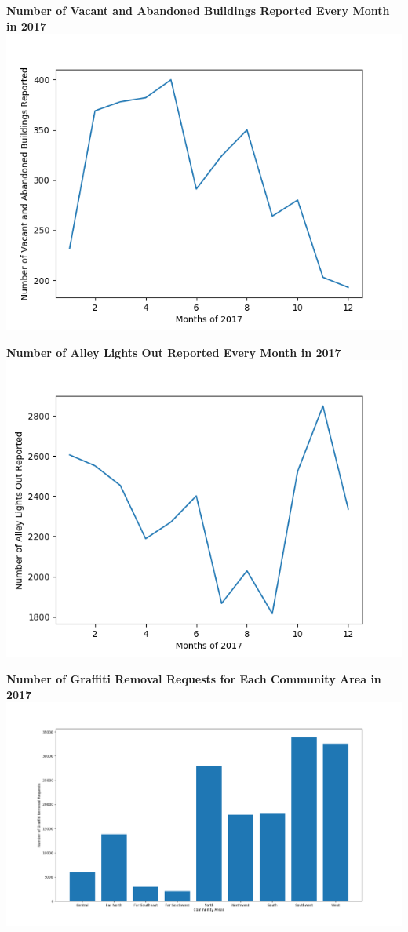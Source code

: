 \documentclass[letterpaper,12pt]{article}
\begin{document}
\noindent \textbf{Number of Vacant and Abandoned Buildings Reported Every Month in 2017} \\
\includegraphics[scale=.9]{buildovertime.png}

\noindent \textbf{Number of Alley Lights Out Reported Every Month in 2017} \\
\includegraphics[scale=.9]{alleysovertime.png} \\

\newpage

\noindent \textbf{Number of Graffiti Removal Requests for Each Community Area in 2017} \\
\includegraphics[scale=.46]{grafovercommunity.png}
\end{document}
